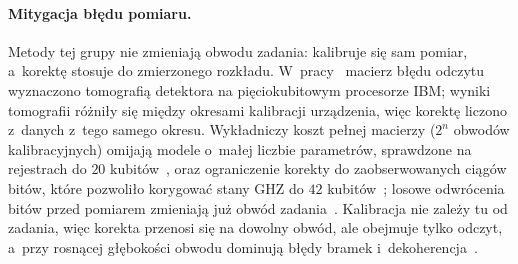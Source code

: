 \paragraph{Mitygacja błędu pomiaru.}
Metody tej grupy nie zmieniają obwodu zadania: kalibruje się sam pomiar, a~korektę stosuje do zmierzonego rozkładu.
W~pracy~\cite{maciejewski_mitigation_2020} macierz błędu odczytu wyznaczono tomografią detektora na pięciokubitowym procesorze IBM; wyniki tomografii różniły się między okresami kalibracji urządzenia, więc korektę liczono z~danych z~tego samego okresu.
Wykładniczy koszt pełnej macierzy ($2^n$ obwodów kalibracyjnych) omijają modele o~małej liczbie parametrów, sprawdzone na rejestrach do $20$ kubitów~\cite{bravyi_mitigating_2021,geller_toward_2021}, oraz ograniczenie korekty do zaobserwowanych ciągów bitów, które pozwoliło korygować stany GHZ do $42$ kubitów~\cite{nation_scalable_2021}; losowe odwrócenia bitów przed pomiarem zmieniają już obwód zadania~\cite{van_den_berg_model-free_2022}.
Kalibracja nie zależy tu od zadania, więc korekta przenosi się na dowolny obwód, ale obejmuje tylko odczyt, a~przy rosnącej głębokości obwodu dominują błędy bramek i~dekoherencja~\cite{nation_scalable_2021}.

